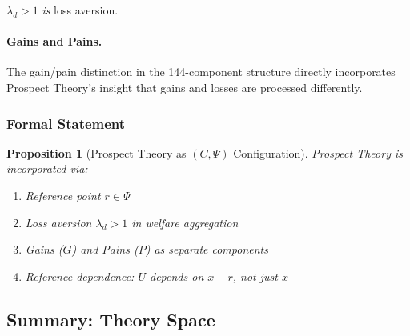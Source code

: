 \documentclass[12pt,a4paper]{article}
\newtheorem{proposition}[theorem]{Proposition}
\begin{document}
$\lambda_d > 1$ \emph{is} loss aversion.

\paragraph{Gains and Pains.}
The gain/pain distinction in the 144-component structure directly incorporates
Prospect Theory's insight that gains and losses are processed differently.

\subsubsection{Formal Statement}

\begin{proposition}[Prospect Theory as $(C, \Psi)$ Configuration]
Prospect Theory is incorporated via:
\begin{enumerate}
  \item Reference point $r \in \Psi$
  \item Loss aversion $\lambda_d > 1$ in welfare aggregation
  \item Gains ($G$) and Pains ($P$) as separate components
  \item Reference dependence: $U$ depends on $x - r$, not just $x$
\end{enumerate}
\end{proposition}

\subsection{Summary: Theory Space}
\label{app:theoryspace}
\end{document}
